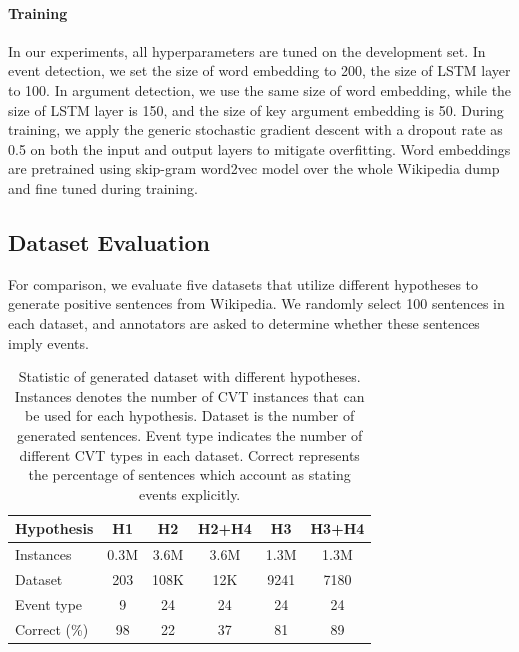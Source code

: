 \documentclass{article}
\begin{document}
\paragraph{Training}
In our experiments, all hyperparameters are tuned on the development set. In event detection, we set the size of word embedding to 200, the size of LSTM layer to 100. In argument detection, we use the same size of word embedding, while the size of LSTM layer is 150, and the size of key argument embedding is 50.
During training, we apply the generic stochastic gradient descent \cite{bottou2010large} with a dropout rate as 0.5 on both the input and output layers to mitigate overfitting. Word embeddings are pretrained using skip-gram word2vec model \cite{mikolov2013distributed} over the whole Wikipedia dump and fine tuned during training. 

\subsection{Dataset Evaluation}\label{sec:evalhypo}
For comparison, we evaluate five datasets that utilize different hypotheses to generate positive sentences from Wikipedia. We randomly select 100 sentences in each dataset, and annotators are asked to determine whether these sentences imply events. 

\begin{table}[h]
\small
\centering
\begin{tabular}{|l|c|c|c|c|c|} \hline
	Hypothesis & H1 & H2 & H2+H4 & H3 & H3+H4 \\ \hline
	Instances & 0.3M & 3.6M & 3.6M & 1.3M & 1.3M \\ \hline
	Dataset & 203 & 108K & 12K & 9241 & 7180 \\ \hline
	Event type & 9 & 24 & 24 & 24 & 24 \\ \hline
	Correct (\%) & 98 & 22 & 37 & 81 & 89 \\ \hline
\end{tabular}
\caption{Statistic of generated dataset with different hypotheses. Instances denotes the number of CVT instances that can be used for each hypothesis. Dataset is the number of generated sentences. Event type indicates the number of different CVT types in each dataset. Correct represents the percentage of sentences which account as stating events explicitly. \label{tab:3}}
\end{table}
\end{document}

